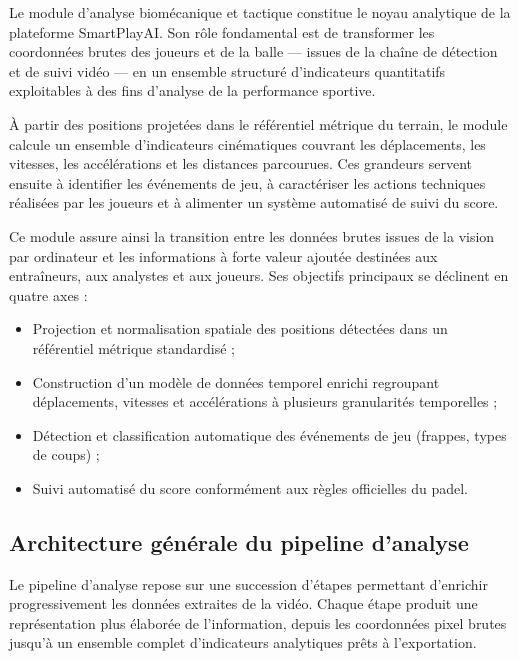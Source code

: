 Le module d'analyse biomécanique et tactique constitue le noyau analytique de la plateforme
SmartPlayAI. Son rôle fondamental est de transformer les coordonnées brutes des joueurs et de
la balle — issues de la chaîne de détection et de suivi vidéo — en un ensemble structuré
d'indicateurs quantitatifs exploitables à des fins d'analyse de la performance sportive.

À partir des positions projetées dans le référentiel métrique du terrain, le module calcule
un ensemble d'indicateurs cinématiques couvrant les déplacements, les vitesses, les
accélérations et les distances parcourues. Ces grandeurs servent ensuite à identifier les
événements de jeu, à caractériser les actions techniques réalisées par les joueurs et à
alimenter un système automatisé de suivi du score.

Ce module assure ainsi la transition entre les données brutes issues de la vision par
ordinateur et les informations à forte valeur ajoutée destinées aux entraîneurs, aux
analystes et aux joueurs. Ses objectifs principaux se déclinent en quatre axes :

\begin{itemize}[leftmargin=1.5em]
  \item Projection et normalisation spatiale des positions détectées dans un référentiel
        métrique standardisé ;
  \item Construction d'un modèle de données temporel enrichi regroupant déplacements,
        vitesses et accélérations à plusieurs granularités temporelles ;
  \item Détection et classification automatique des événements de jeu (frappes, types
        de coups) ;
  \item Suivi automatisé du score conformément aux règles officielles du padel.
\end{itemize}

\subsection{Architecture générale du pipeline d'analyse}

Le pipeline d'analyse repose sur une succession d'étapes permettant d'enrichir
progressivement les données extraites de la vidéo. Chaque étape produit une représentation
plus élaborée de l'information, depuis les coordonnées pixel brutes jusqu'à un ensemble
complet d'indicateurs analytiques prêts à l'exportation.

